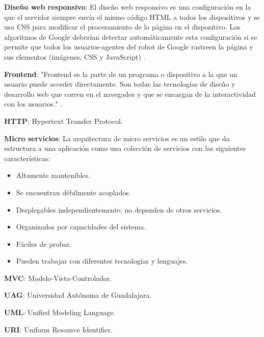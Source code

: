     \textbf{Diseño web responsivo}: El diseño web responsivo es una configuración en la que el servidor siempre envía el mismo código HTML a todos los dispositivos y se usa CSS para modificar el procesamiento de la página en el dispositivo. Los algoritmos de Google deberían detectar automáticamente esta configuración si se permite que todos los usuarios-agentes del robot de Google rastreen la página y sus elementos (imágenes, CSS y JavaScript) \cite{GoogleResponsivo}.
    
    \textbf{Frontend}: "Frontend es la parte de un programa o dispositivo a la que un usuario puede acceder directamente. Son todas las tecnologías de diseño y desarrollo web que corren en el navegador y que se encargan de la interactividad con los usuarios." \cite{Frontend}.
    
    \textbf{HTTP}: Hypertext Transfer Protocol.
    
    \textbf{Micro servicios}: La arquitectura de micro servicios es un estilo que da estructura a una aplicación como una colección de servicios con las siguientes características\cite{richards2020fundamentals}:
    
    \begin{itemize}
        \item Altamente mantenibles.
        \item Se encuentran débilmente acoplados.
        \item Desplegables independientemente; no dependen de otros servicios.
        \item Organizados por capacidades del sistema.
        \item Fáciles de probar.
        \item Pueden trabajar con diferentes tecnologías y lenguajes.
    \end{itemize}
    
    \textbf{MVC}: Modelo-Vista-Controlador.
    
    \textbf{UAG}: Universidad Autónoma de Guadalajara.
    
    \textbf{UML}: Unified Modeling Language.
    
    \textbf{URI}: Uniform Resource Identifier.